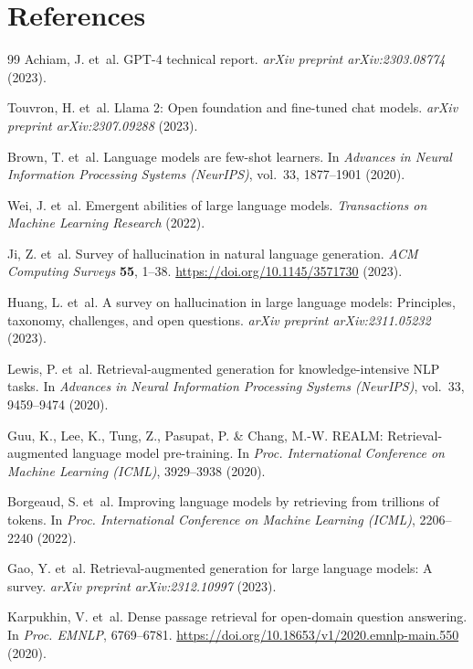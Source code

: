 \documentclass[fleqn,10pt]{article}
\begin{document}
\section*{References}
\begin{thebibliography}{99}
Achiam, J. et~al. GPT-4 technical report. \textit{arXiv preprint arXiv:2303.08774} (2023).

Touvron, H. et~al. Llama 2: Open foundation and fine-tuned chat models. \textit{arXiv preprint arXiv:2307.09288} (2023).

Brown, T. et~al. Language models are few-shot learners. In \textit{Advances in Neural Information Processing Systems (NeurIPS)}, vol.~33, 1877--1901 (2020).

Wei, J. et~al. Emergent abilities of large language models. \textit{Transactions on Machine Learning Research} (2022).

Ji, Z. et~al. Survey of hallucination in natural language generation. \textit{ACM Computing Surveys} \textbf{55}, 1--38. \url{https://doi.org/10.1145/3571730} (2023).

Huang, L. et~al. A survey on hallucination in large language models: Principles, taxonomy, challenges, and open questions. \textit{arXiv preprint arXiv:2311.05232} (2023).

Lewis, P. et~al. Retrieval-augmented generation for knowledge-intensive NLP tasks. In \textit{Advances in Neural Information Processing Systems (NeurIPS)}, vol.~33, 9459--9474 (2020).

Guu, K., Lee, K., Tung, Z., Pasupat, P. \& Chang, M.-W. REALM: Retrieval-augmented language model pre-training. In \textit{Proc. International Conference on Machine Learning (ICML)}, 3929--3938 (2020).

Borgeaud, S. et~al. Improving language models by retrieving from trillions of tokens. In \textit{Proc. International Conference on Machine Learning (ICML)}, 2206--2240 (2022).

Gao, Y. et~al. Retrieval-augmented generation for large language models: A survey. \textit{arXiv preprint arXiv:2312.10997} (2023).

Karpukhin, V. et~al. Dense passage retrieval for open-domain question answering. In \textit{Proc. EMNLP}, 6769--6781. \url{https://doi.org/10.18653/v1/2020.emnlp-main.550} (2020).


\end{thebibliography}
\end{document}
